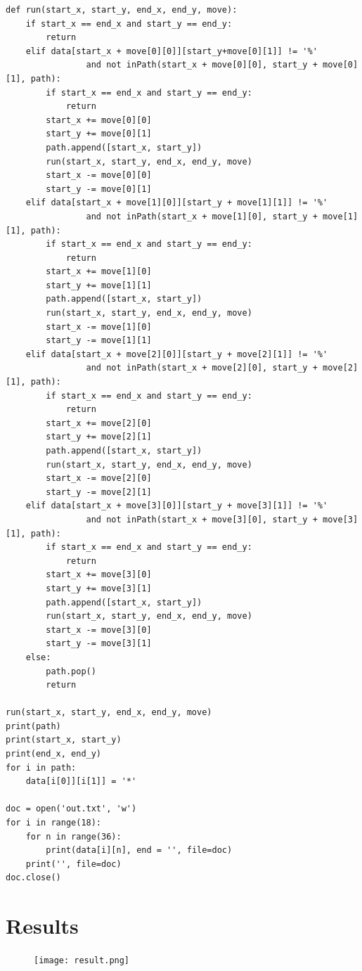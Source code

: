 \documentclass[a4paper, 11pt]{article}
\begin{document}
\begin{lstlisting}
def run(start_x, start_y, end_x, end_y, move):
    if start_x == end_x and start_y == end_y:
        return
    elif data[start_x + move[0][0]][start_y+move[0][1]] != '%' 
                and not inPath(start_x + move[0][0], start_y + move[0][1], path):
        if start_x == end_x and start_y == end_y:
            return
        start_x += move[0][0]
        start_y += move[0][1]
        path.append([start_x, start_y])
        run(start_x, start_y, end_x, end_y, move)
        start_x -= move[0][0]
        start_y -= move[0][1]
    elif data[start_x + move[1][0]][start_y + move[1][1]] != '%' 
                and not inPath(start_x + move[1][0], start_y + move[1][1], path):
        if start_x == end_x and start_y == end_y:
            return
        start_x += move[1][0]
        start_y += move[1][1]
        path.append([start_x, start_y])
        run(start_x, start_y, end_x, end_y, move)
        start_x -= move[1][0]
        start_y -= move[1][1]
    elif data[start_x + move[2][0]][start_y + move[2][1]] != '%' 
                and not inPath(start_x + move[2][0], start_y + move[2][1], path):
        if start_x == end_x and start_y == end_y:
            return
        start_x += move[2][0]
        start_y += move[2][1]
        path.append([start_x, start_y])
        run(start_x, start_y, end_x, end_y, move)
        start_x -= move[2][0]
        start_y -= move[2][1]
    elif data[start_x + move[3][0]][start_y + move[3][1]] != '%' 
                and not inPath(start_x + move[3][0], start_y + move[3][1], path):
        if start_x == end_x and start_y == end_y:
            return
        start_x += move[3][0]
        start_y += move[3][1]
        path.append([start_x, start_y])
        run(start_x, start_y, end_x, end_y, move)
        start_x -= move[3][0]
        start_y -= move[3][1]
    else:
        path.pop()
        return

run(start_x, start_y, end_x, end_y, move)
print(path)
print(start_x, start_y)
print(end_x, end_y)
for i in path:
    data[i[0]][i[1]] = '*'

doc = open('out.txt', 'w')
for i in range(18):
    for n in range(36):
        print(data[i][n], end = '', file=doc)
    print('', file=doc)
doc.close()
\end{lstlisting}


\section{Results}
\begin{figure}
\centering
\texttt{[image: result.png]}
\end{figure}


%
%
\end{document}
